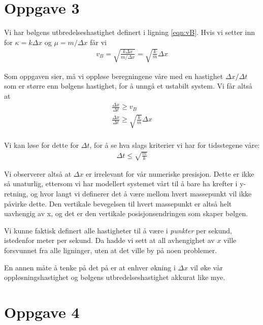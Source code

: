 \documentclass[12p,a4paper]{report}
\begin{document}
\section*{Oppgave 3}
Vi har bølgens utbredelseshastighet definert i ligning \ref{eqn:vB}. Hvis vi setter inn for $\kappa = k\Delta x$ og $\mu = m/\Delta x$ får vi
\begin{align*}
v_B = \sqrt{\frac{k\Delta x}{m/\Delta x}} = \sqrt{\frac{k}{m}}\Delta x
\end{align*}

Som oppgaven sier, må vi oppløse beregningene våre med en hastighet $\Delta x/\Delta t$ som er større enn bølgens hastighet, for å unngå et ustabilt system. Vi får altså at
\begin{align*}
\frac{\Delta x}{\Delta t} \geq v_B \\
\frac{\Delta x}{\Delta t} \geq \sqrt{\frac{k}{m}}\Delta x \\
\end{align*}

Vi kan løse for dette for $\Delta t$, for å se hva slags kriterier vi har for tidsstegene våre:
\begin{align}\label{eqn:dt}
\Delta t \leq \sqrt{\frac{m}{k}}
\end{align}

Vi observerer altså at $\Delta x$ er irrelevant for vår numeriske presisjon. Dette er ikke så unaturlig, ettersom vi har modellert systemet vårt til å bare ha krefter i y-retning, og hvor langt vi definerer det å være mellom hvert massepunkt vil ikke påvirke dette. Den vertikale bevegelsen til hvert massepunkt er altså helt uavhengig av x, og det er den vertikale posisjonsendringen som skaper bølgen.

Vi kunne faktisk definert alle hastigheter til å være i \textit{punkter} per sekund, istedenfor meter per sekund. Da hadde vi sett at all avhengighet av $x$ ville forsvunnet fra alle ligninger, uten at det ville by på noen problemer.

En annen måte å tenke på det på er at enhver økning i $\Delta x$ vil øke vår oppløsningshastighet og bølgens utbredelseshastighet akkurat like mye.



\section*{Oppgave 4}
\end{document}
